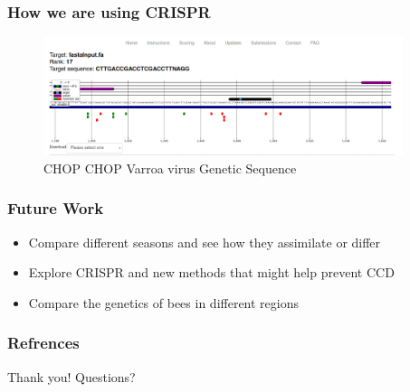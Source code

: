 \documentclass{beamer}
\begin{document}
\begin{frame}
  \frametitle{How we are using CRISPR}
  \begin{figure}
  \centering
    \includegraphics[width=10.5cm]{VirusSequence.png}
    \caption{CHOP CHOP Varroa virus Genetic Sequence}
    \label{CHOP CHOP}
  \centering
  \end{figure}
\end{frame}

\begin{frame}
  \frametitle{Future Work}
  \begin{itemize}
  \item Compare different seasons and see how they assimilate or differ
  \item Explore CRISPR and new methods that might help prevent CCD
  \item Compare the genetics of bees in different regions
  \end{itemize}
  
\end{frame}

\begin{frame}
  \frametitle{Refrences}

\end{frame}

\begin{frame}
Thank you!
Questions?
\end{frame}
\end{document}
